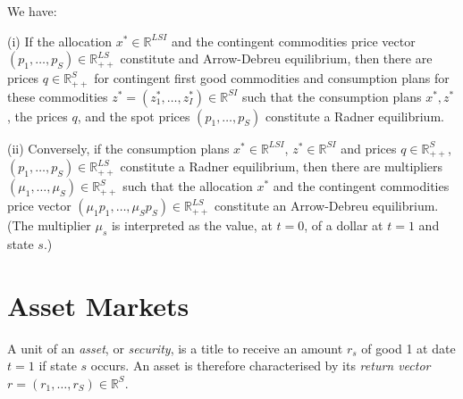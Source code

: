 \begin{prop}
    We have:

    (i) If the allocation $x^* \in \mathbb{R}^{LSI}$ and the contingent commodities price vector $(p_1, \dots, p_S) \in \mathbb{R}^{LS}_{++}$ constitute and Arrow-Debreu equilibrium, then there are prices $q \in \mathbb{R}^{S}_{++}$ for contingent first good commodities and consumption plans for these commodities $z^* = (z^*_{1}, \dots, z^*_{I}) \in \mathbb{R}^{SI}$ such that the consumption plans $x^*, z^*$, the prices $q$, and the spot prices $(p_1, \dots, p_S)$ constitute a Radner equilibrium.

    (ii) Conversely, if the consumption plans $x^* \in \mathbb{R}^{LSI}$, $z^* \in \mathbb{R}^{SI}$ and prices $q \in \mathbb{R}^{S}_{++}$, $(p_1, \dots, p_S) \in \mathbb{R}^{LS}_{++}$ constitute a Radner equilibrium, then there are multipliers $(\mu_1, \dots, \mu_S) \in \mathbb{R}^{S}_{++}$ such that the allocation $x^*$ and the contingent commodities price vector $(\mu_1 p_1, \dots, \mu_S p_S) \in \mathbb{R}^{LS}_{++}$ constitute an Arrow-Debreu equilibrium. (The multiplier $\mu_s$ is interpreted as the value, at $t = 0$, of a dollar at $t = 1$ and state $s$.)
\end{prop}


\section{Asset Markets}

\begin{defn}
    A unit of an \emph{asset}, or \emph{security}, is a title to receive an amount $r_s$ of good 1 at date $t = 1$ if state $s$ occurs. An asset is therefore characterised by its \emph{return vector} $r = (r_1, \dots, r_S) \in \mathbb{R}^{S}$.
\end{defn}

